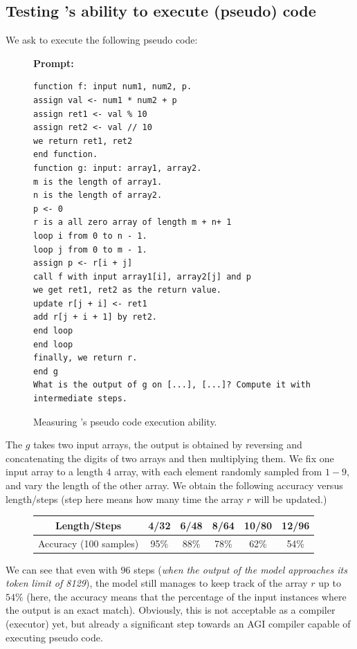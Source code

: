 \subsection{Testing {\DV}'s ability to execute (pseudo) code}
\label{sec:code_a5}
We ask {\DV} to execute the following pseudo code:
\begin{figure}[H]
\begin{AIbox}{\DV}
{\bf Prompt:} \begin{verbatim}
function f: input num1, num2, p.
assign val <- num1 * num2 + p
assign ret1 <- val % 10
assign ret2 <- val // 10
we return ret1, ret2 
end function.
function g: input: array1, array2.
m is the length of array1.
n is the length of array2.
p <- 0
r is a all zero array of length m + n+ 1
loop i from 0 to n - 1.
loop j from 0 to m - 1.
assign p <- r[i + j]
call f with input array1[i], array2[j] and p
we get ret1, ret2 as the return value.
update r[j + i] <- ret1
add r[j + i + 1] by ret2.
end loop
end loop
finally, we return r.
end g
What is the output of g on [...], [...]? Compute it with intermediate steps.
\end{verbatim}
\end{AIbox}
\caption{Measuring \DV's pseudo code execution ability.}
\label{fig:pseudocode2}
\end{figure}

 The $g$ takes two input arrays, the output is obtained by reversing and concatenating the digits of two arrays and then multiplying them. We fix one input array to a length $4$ array, with each element randomly sampled from $1-9$, and vary the length of the other array. We obtain the following accuracy versus length/steps (step here means how many time the array $r$ will be updated.)
 \begin{figure}[H]
\centering
 \begin{tabular}{c|ccccc}
\toprule
Length/Steps & 4/32 & 6/48 & 8/64 & 10/80 & 12/96 \\
\midrule
\midrule
Accuracy (100 samples) & 95\% & 88\% & 78\% & 62\% & 54\% \\
\bottomrule
\end{tabular}
\end{figure}
\vspace{-0.3cm}

We can see that even with $96$ steps (\emph{when the output of the model approaches its token limit of 8129}), the model still manages to keep track of the array $r$ up to $54 \%$ (here, the accuracy means that the percentage of the input instances where the output is an exact match). Obviously, this is not acceptable as a compiler (executor) yet, but already a significant step towards an AGI compiler capable of executing pseudo code. 

